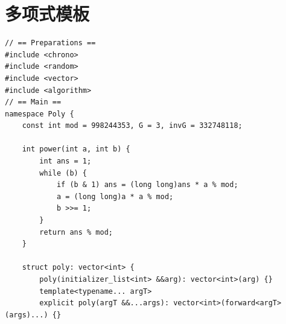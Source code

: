 \section{多项式模板}

\begin{verbatim}
// == Preparations ==
#include <chrono>
#include <random>
#include <vector>
#include <algorithm>
// == Main ==
namespace Poly {
    const int mod = 998244353, G = 3, invG = 332748118;

    int power(int a, int b) {
        int ans = 1;
        while (b) {
            if (b & 1) ans = (long long)ans * a % mod;
            a = (long long)a * a % mod;
            b >>= 1;
        }
        return ans % mod;
    }

    struct poly: vector<int> {
        poly(initializer_list<int> &&arg): vector<int>(arg) {}
        template<typename... argT>
        explicit poly(argT &&...args): vector<int>(forward<argT>(args)...) {}


\end{verbatim}
